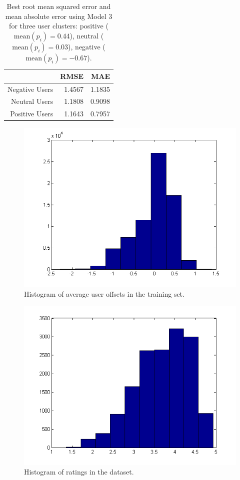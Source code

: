 \documentclass[12pt]{article}
\begin{document}
\begin{table}[htbp]
  \centering
  \caption{Best root mean squared error and mean absolute error using Model 3 for three user clusters: positive ($\text{mean}(p_i)=0.44$), neutral ($\text{mean}(p_i)=0.03$), negative ($\text{mean}(p_i)=-0.67$).}
    \begin{tabular}{rrr}
    \toprule
          & RMSE  & MAE \\
    \midrule
    Negative Users & 1.4567 & 1.1835 \\
    Neutral Users & 1.1808 & 0.9098 \\
    Positive Users & 1.1643 & 0.7957 \\
    \bottomrule
    \end{tabular}%
  \label{tab:results_clusters}%
\end{table}%

\begin{figure}
	\centering
	\includegraphics[scale=0.5]{user_offsets.png}
	\caption{Histogram of average user offsets in the training set.}
	\label{fig:user_offsets}
\end{figure}

\begin{figure}
	\centering
	\includegraphics[scale=0.5]{hist_ratings.png}
	\caption{Histogram of ratings in the dataset.}
	\label{fig:hist_ratings}
\end{figure}
\end{document}
